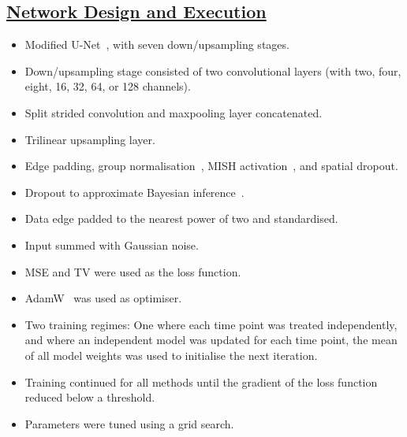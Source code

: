 \documentclass[portrait, color=UCLburgundy, margin=1cm]{uclposter}
\begin{document}
\begin{multicols}{2}
            \subsection*{\underline{\textbf{Network Design and Execution}}}
                \begin{itemize}
                    \item Modified U-Net~\cite{Weng2015U-Net:Segmentation}, with seven down/upsampling stages.
                    \item Down/upsampling stage consisted of two convolutional layers (with two, four, eight, 16, 32, 64, or 128 channels).
                    \item Split strided convolution and maxpooling layer concatenated.
                    \item Trilinear upsampling layer.
                    \item Edge padding, group normalisation~\cite{Wu2018GroupNormalization}, MISH activation~\cite{Misra2020Mish:Function}, and spatial dropout.
                    \item Dropout to approximate Bayesian inference~\cite{Gal2015DropoutLearning}.
                    \item Data edge padded to the nearest power of two and standardised.
                    \item Input summed with Gaussian noise.
                    \item \acrlong{MSE} and \gls{TV} were used as the loss function.
                    \item AdamW~\cite{Loshchilov2017DecoupledRegularization} was used as optimiser.
                    \item Two training regimes: One where each time point was treated independently, and where an independent model was updated for each time point, the mean of all model weights was used to initialise the next iteration.
                    \item Training continued for all methods until the gradient of the loss function reduced below a threshold.
                    \item Parameters were tuned using a grid search.
                \end{itemize}
            

\end{multicols}
\end{document}
